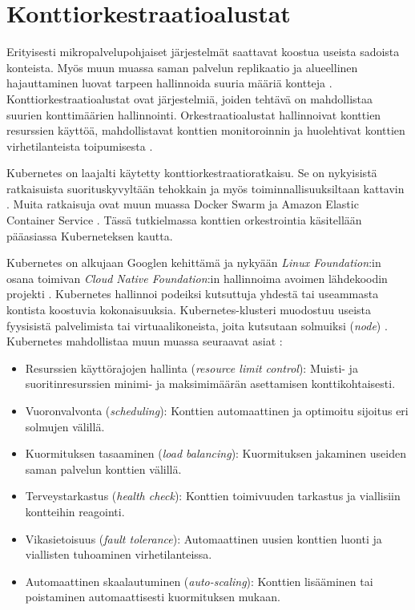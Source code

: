 
\section{Konttiorkestraatioalustat\label{platforms}}

Erityisesti mikropalvelupohjaiset järjestelmät saattavat koostua useista sadoista konteista.
Myös muun muassa saman palvelun replikaatio ja alueellinen hajauttaminen luovat tarpeen hallinnoida suuria määriä kontteja \cite{Khan17}.
Konttiorkestraatioalustat ovat järjestelmiä, joiden tehtävä on mahdollistaa suurien konttimäärien hallinnointi.
Orkestraatioalustat hallinnoivat konttien resurssien käyttöä, mahdollistavat konttien monitoroinnin ja huolehtivat konttien virhetilanteista toipumisesta \cite{Zhou21}.

Kubernetes on laajalti käytetty konttiorkestraatioratkaisu.
Se on nykyisistä ratkaisuista suorituskyvyltään tehokkain ja myös toiminnallisuuksiltaan kattavin \cite{Jawarneh19}.
Muita ratkaisuja ovat muun muassa Docker Swarm ja Amazon Elastic Container Service \cite{Khan17}.
Tässä tutkielmassa konttien orkestrointia käsitellään pääasiassa Kuberneteksen kautta.

Kubernetes on alkujaan Googlen kehittämä ja nykyään \textit{Linux Foundation}:in osana toimivan \textit{Cloud Native Foundation}:in hallinnoima avoimen lähdekoodin projekti \cite{Burns22}.
Kubernetes hallinnoi podeiksi kutsuttuja yhdestä tai useammasta kontista koostuvia kokonaisuuksia.
Kubernetes-klusteri muodostuu useista fyysisistä palvelimista tai virtuaalikoneista, joita kutsutaan solmuiksi (\textit{node}) \cite{Medel18}.
Kubernetes mahdollistaa muun muassa seuraavat asiat \cite{Zhou21}:

\begin{itemize}
\item Resurssien käyttörajojen hallinta (\textit{resource limit control}): Muisti- ja suoritinresurssien minimi- ja maksimimäärän asettamisen konttikohtaisesti.
\item Vuoronvalvonta (\textit{scheduling}): Konttien automaattinen ja optimoitu sijoitus eri solmujen välillä.
\item Kuormituksen tasaaminen (\textit{load balancing}): Kuormituksen jakaminen useiden saman palvelun konttien välillä. 
\item Terveystarkastus (\textit{health check}): Konttien toimivuuden tarkastus ja viallisiin kontteihin reagointi.
\item Vikasietoisuus (\textit{fault tolerance}): Automaattinen uusien konttien luonti ja viallisten tuhoaminen virhetilanteissa.
\item Automaattinen skaalautuminen (\textit{auto-scaling}): Konttien lisääminen tai poistaminen automaattisesti kuormituksen mukaan.
\end{itemize}

